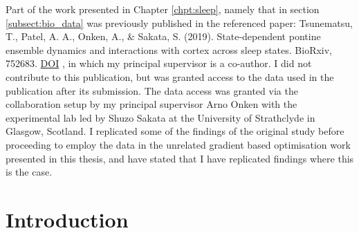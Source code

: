 \documentclass[mphil,deptreport,ianc]{infthesis} %
\begin{document}
\begin{preliminary}
Part of the work presented in Chapter \ref{chpt:sleep}, namely that in section \ref{subsect:bio_data} was previously published in the referenced paper: Tsunematsu, T., Patel, A. A., Onken, A., \& Sakata, S. (2019). State-dependent pontine ensemble dynamics and interactions with cortex across sleep states. BioRxiv, 752683. \href{https://doi.org/10.1101/752683}{DOI} \cite{Tsunematsu2019}, 
in which my principal supervisor is a co-author.
I did not contribute to this publication, but was granted access to the data used in the publication after its submission.
The data access was granted via the collaboration setup by my principal supervisor Arno Onken with the experimental lab led by Shuzo Sakata at the University of Strathclyde in Glasgow, Scotland.
I replicated some of the findings of the original study before proceeding to employ the data in the unrelated gradient based optimisation work presented in this thesis, and have stated that I have replicated findings where this is the case. 



\tableofcontents
\end{preliminary}


\chapter{Introduction}




\end{document}
